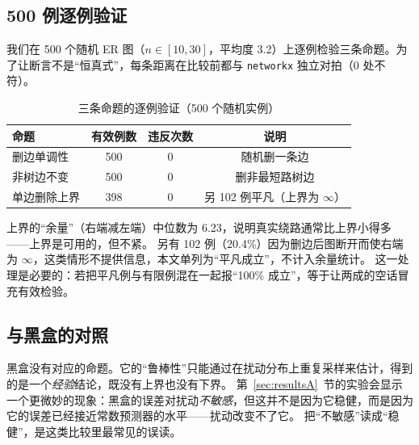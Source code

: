 \subsection{500 例逐例验证}

我们在 500 个随机 ER 图（$n\in[10,30]$，平均度 3.2）上逐例检验三条命题。为了让断言不是“恒真式”，每条距离在比较前都与 \texttt{networkx} 独立对拍（0 处不符）。

\begin{table}[H]
\centering
\caption{三条命题的逐例验证（500 个随机实例）}
\label{tab:robust}
\small
\setlength{\tabcolsep}{5pt}
\begin{tabular}{lccc}
\toprule
命题 & 有效例数 & 违反次数 & 说明 \\
\midrule
删边单调性 & 500 & 0 & 随机删一条边 \\
非树边不变 & 500 & 0 & 删非最短路树边 \\
单边删除上界 & 398 & 0 & 另 102 例平凡（上界为 $\infty$） \\
\bottomrule
\end{tabular}
\end{table}

上界的“余量”（右端减左端）中位数为 6.23，说明真实绕路通常比上界小得多——上界是可用的，但不紧。
另有 102 例（20.4\%）因为删边后图断开而使右端为 $\infty$，这类情形不提供信息，本文单列为“平凡成立”，不计入余量统计。
这一处理是必要的：若把平凡例与有限例混在一起报“100\% 成立”，等于让两成的空话冒充有效检验。

\subsection{与黑盒的对照}

黑盒没有对应的命题。它的“鲁棒性”只能通过在扰动分布上重复采样来估计，得到的是一个\emph{经验}结论，既没有上界也没有下界。
第~\ref{sec:resultsA}~节的实验会显示一个更微妙的现象：黑盒的误差对扰动\emph{不敏感}，但这并不是因为它稳健，而是因为它的误差已经接近常数预测器的水平——扰动改变不了它。
把“不敏感”读成“稳健”，是这类比较里最常见的误读。

